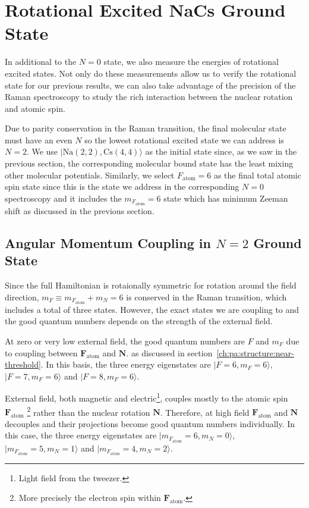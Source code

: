 \section{Rotational Excited NaCs Ground State}
\label{ch:raman-spectroscopy:n2}

In additional to the $N=0$ state, we also measure the energies of rotational excited states.
Not only do these measurements allow us to verify the rotational state for our previous results,
we can also take advantage of the precision of the Raman spectroscopy
to study the rich interaction between the nuclear rotation and atomic spin.

Due to parity conservation in the Raman transition,
the final molecular state must have an even $N$
so the lowest rotational excited state we can address is $N=2$.
We use $|\mathrm{Na(2, 2),Cs(4, 4)}\rangle$ as the initial state since,
as we saw in the previous section, the corresponding molecular bound state
has the least mixing other molecular potentials.
Similarly, we select $F_{\mathrm{atom}}=6$ as the final total atomic spin state
since this is the state we address in the corresponding $N=0$ spectroscopy and
it includes the $m_{F_{\mathrm{atom}}}=6$ state which has minimum
Zeeman shift as discussed in the previous section.

\subsection{Angular Momentum Coupling in \texorpdfstring{$N=2$}{N=2} Ground State}
\label{ch:raman-spectroscopy:n2:angular-momentum}

Since the full Hamiltonian is rotaionally symmetric for rotation around the field direction,
$m_F\equiv m_{F_{\mathrm{atom}}}+m_{N}=6$ is conserved in the Raman transition,
which includes a total of three states.
However, the exact states we are coupling to and the good quantum numbers depends on
the strength of the external field.

At zero or very low external field, the good quantum numbers are $F$ and $m_F$
due to coupling between $\mathbf{F}_{\mathrm{atom}}$ and $\mathbf{N}$.
as discussed in section~\ref{ch:pa:structure:near-threshold}.
In this basis, the three energy eigenstates are
$|F=6,m_F=6\rangle$, $|F=7,m_F=6\rangle$ and $|F=8,m_F=6\rangle$.

External field, both magnetic and electric\footnote{Light field from the tweezer.},
couples mostly to the atomic spin $\mathbf{F}_{\mathrm{atom}}$
\footnote{More precisely the electron spin within $\mathbf{F}_{\mathrm{atom}}$.}
rather than the nuclear rotation $\mathbf{N}$.
Therefore, at high field $\mathbf{F}_{\mathrm{atom}}$ and $\mathbf{N}$
decouples and their projections become good quantum numbers individually.
In this case, the three energy eigenstates are
$|m_{F_\mathrm{atom}}=6,m_N=0\rangle$, $|m_{F_\mathrm{atom}}=5,m_N=1\rangle$ and
$|m_{F_\mathrm{atom}}=4,m_N=2\rangle$.

